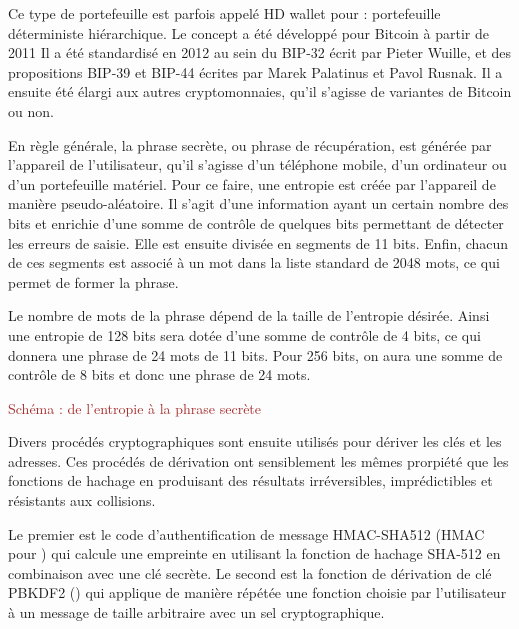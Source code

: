 Ce type de portefeuille est parfois appelé HD wallet pour  : portefeuille déterministe hiérarchique. Le concept a été développé pour Bitcoin à partir de 2011 Il a été standardisé en 2012 au sein du BIP-32 écrit par Pieter Wuille, et des propositions BIP-39 et BIP-44 écrites par Marek Palatinus et Pavol Rusnak. Il a ensuite été élargi aux autres cryptomonnaies, qu'il s'agisse de variantes de Bitcoin ou non.


En règle générale, la phrase secrète, ou phrase de récupération, est générée par l'appareil de l'utilisateur, qu'il s'agisse d'un téléphone mobile, d'un ordinateur ou d'un portefeuille matériel. Pour ce faire, une entropie est créée par l'appareil de manière pseudo-aléatoire. Il s'agit d'une information ayant un certain nombre des bits et enrichie d'une somme de contrôle de quelques bits permettant de détecter les erreurs de saisie. Elle est ensuite divisée en segments de 11 bits. Enfin, chacun de ces segments est associé à un mot dans la liste standard de 2048 mots, ce qui permet de former la phrase. %

Le nombre de mots de la phrase dépend de la taille de l'entropie désirée. Ainsi une entropie de 128 bits sera dotée d'une somme de contrôle de 4 bits, ce qui donnera une phrase de 24 mots de 11 bits. Pour 256 bits, on aura une somme de contrôle de 8 bits et donc une phrase de 24 mots.

\textcolor{brown}{Schéma : de l'entropie à la phrase secrète}


Divers procédés cryptographiques sont ensuite utilisés pour dériver les clés et les adresses. Ces procédés de dérivation ont sensiblement les mêmes prorpiété que les fonctions de hachage en produisant des résultats irréversibles, imprédictibles et résistants aux collisions.

Le premier est le code d'authentification de message HMAC-SHA512 (HMAC pour ) qui calcule une empreinte en utilisant la fonction de hachage SHA-512 en combinaison avec une clé secrète. Le second est la fonction de dérivation de clé PBKDF2 () qui applique de manière répétée une fonction choisie par l'utilisateur à un message de taille arbitraire avec un sel cryptographique. 

